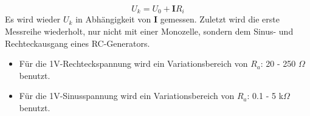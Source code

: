 \begin{equation}
  U_k = U_0 + \symbf{I} R_i
  \label{eqn:eq5}
\end{equation}
Es wird wieder $U_k$ in Abhängigkeit von $\symbf{I}$ gemessen.
Zuletzt wird die erste Messreihe wiederholt, nur nicht mit einer Monozelle, sondern dem Sinus- und Rechteckausgang eines RC-Generators.
\begin{itemize}
  \item Für die 1V-Rechteckspannung wird ein Variationsbereich von $R_a$: 20 - 250 $\Omega$ benutzt.
  \item Für die 1V-Sinusspannung wird ein Variationsbereich von $R_a$: 0.1 - 5 k$\Omega$ benutzt.
\end{itemize}
